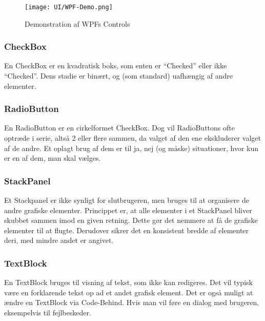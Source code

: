 \begin{wrapfigure}[22]{R}{0.5\textwidth}
    \label{img:wpfdemo}
    \vspace{-30pt}
    \begin{center}
        \texttt{[image: UI/WPF-Demo.png]}
    \end{center}
    \vspace{-15pt}
    \caption{Demonstration af WPFs Controls}
    \vspace{-15pt}
\end{wrapfigure}

\subsubsection*{CheckBox}
En CheckBox er en kvadratisk boks, som enten er ``Checked'' eller ikke ``Checked''. 
Dens stadie er binært, og (som standard) uafhængig af andre elementer.

\subsubsection*{RadioButton}
En RadioButton er en cirkelformet CheckBox.
Dog vil RadioButtons ofte optræde i serie, altså 2 eller flere sammen, da valget af den ene ekskluderer valget af de andre. 
Et oplagt brug af dem er til ja, nej (og måske) situationer, hvor kun er en af dem, man skal vælges.

\subsubsection*{StackPanel}
Et Stackpanel er ikke synligt for slutbrugeren, men bruges til at organisere de andre grafiske elementer.
Princippet er, at alle elementer i et StackPanel bliver skubbet sammen imod en given retning.
Dette gør det nemmere at få de grafiske elementer til at flugte.
Derudover sikrer det en konsistent bredde af elementer deri, med mindre andet er angivet.

\subsubsection*{TextBlock}
En TextBlock bruges til visning af tekst, som ikke kan redigeres.
Det vil typisk være en forklarende tekst op ad et andet grafisk element.
Det er også muligt at ændre en TextBlock via Code-Behind. 
Hvis man vil føre en dialog med brugeren, eksempelvis til fejlbeskeder.

